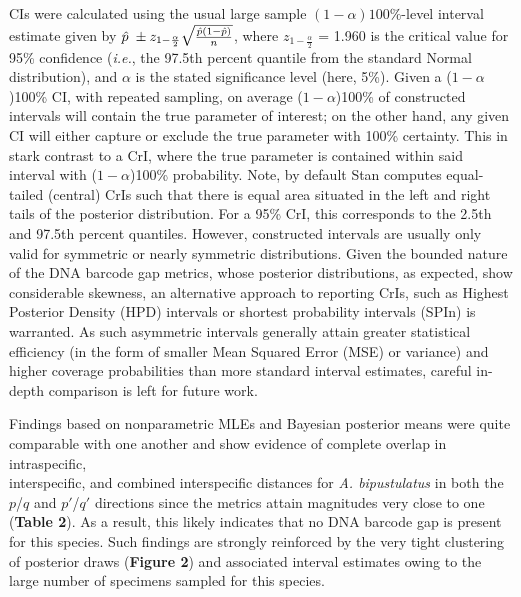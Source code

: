 \documentclass[12pt]{article}
\begin{document}
\noindent  CIs were calculated using the usual large sample  $(1-\alpha)100\%$-level interval estimate given by $\hat{p} \hspace{1mm} \pm z_{1 - \frac{\alpha}{2}}\sqrt{\frac{\hat{p}(1 - \hat{p})}{n}}$, where $z_{1 - \frac{\alpha}{2}}$ = 1.960 is the critical value for 95\% confidence (\textit{i.e.}, the 97.5th percent quantile from the standard Normal distribution), and $\alpha$ is the stated significance level (here, 5\%). Given a ($1 - \alpha$)100\% CI, with repeated sampling, on average ($1 - \alpha$)100\% of constructed intervals will contain the true parameter of interest; on the other hand, any given CI will either capture or exclude the true parameter with 100\% certainty. This in stark contrast to a CrI, where the true parameter is contained within said interval with ($1 - \alpha$)100\% probability. Note, by default Stan computes equal-tailed (central) CrIs such that there is equal area situated in the left and right tails of the posterior distribution. For a 95\% CrI, this corresponds to the 2.5th and 97.5th percent quantiles. However, constructed intervals are usually only valid for symmetric or nearly symmetric distributions. Given the bounded nature of the DNA barcode gap metrics, whose posterior distributions, as expected, show considerable skewness, an alternative approach to reporting CrIs, such as Highest Posterior Density (HPD) intervals \citep{chen1999monte} or shortest probability intervals (SPIn) \citep{liu2015simulation} is warranted. As such asymmetric intervals generally attain greater statistical efficiency (in the form of smaller Mean Squared Error (MSE) or variance) and higher coverage probabilities than more standard interval estimates, careful in-depth comparison is left for future work. 

Findings based on nonparametric MLEs and Bayesian posterior means were quite \\ comparable with one another and show evidence of complete overlap in intraspecific, \\ interspecific, and combined interspecific distances for \textit{A. bipustulatus} in both the $p$/$q$ and $p'$/$q'$ directions since the metrics attain magnitudes very close to one (\textbf{Table 2}). As a result, this likely indicates that no DNA barcode gap is present for this species. Such findings are strongly reinforced by the very tight clustering of posterior draws (\textbf{Figure 2}) and associated interval estimates owing to the large number of specimens sampled for this species.
\end{document}
